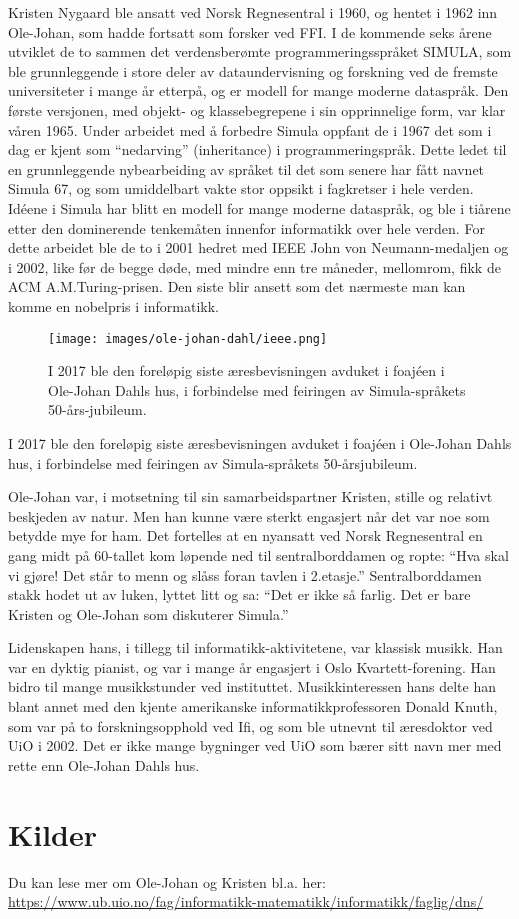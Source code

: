 Kristen Nygaard ble ansatt ved Norsk Regnesentral i 1960, og hentet i 1962 inn Ole-Johan, som hadde fortsatt som forsker ved FFI. I de kommende seks årene utviklet de to sammen det verdensberømte programmeringsspråket SIMULA, som ble grunnleggende i store deler av dataundervisning og forskning ved de fremste universiteter i mange år etterpå, og er modell for mange moderne dataspråk. Den første versjonen, med objekt- og klassebegrepene i sin opprinnelige form, var klar våren 1965. Under arbeidet med å forbedre Simula oppfant de i 1967 det som i dag er kjent som ``nedarving'' (inheritance) i programmeringspråk. Dette ledet til en grunnleggende nybearbeiding av språket til det som senere har fått navnet Simula 67, og som umiddelbart vakte stor oppsikt i fagkretser i hele verden. Idéene i Simula har blitt en modell for mange moderne dataspråk, og ble i tiårene etter den dominerende tenkemåten innenfor informatikk over hele verden. For dette arbeidet ble de to i 2001 hedret med IEEE John von Neumann-medaljen og i 2002, like før de begge døde, med mindre enn tre måneder, mellomrom, fikk de ACM A.M.Turing-prisen. Den siste blir ansett som det nærmeste man kan komme en nobelpris i informatikk.

\begin{figure}
	\texttt{[image: images/ole-johan-dahl/ieee.png]}
	\label{fig:ieee}
	\caption{I 2017 ble den foreløpig siste æresbevisningen avduket i foajéen i Ole-Johan Dahls hus, i forbindelse med feiringen av Simula-språkets 50-års-jubileum.}
\end{figure}

I 2017 ble den foreløpig siste æresbevisningen avduket i foajéen i Ole-Johan Dahls hus, i forbindelse med feiringen av Simula-språkets 50-årsjubileum.

Ole-Johan var, i motsetning til sin samarbeidspartner Kristen, stille og relativt beskjeden av natur. Men han kunne være sterkt engasjert når det var noe som betydde mye for ham. Det fortelles at en nyansatt ved Norsk Regnesentral en gang midt på 60-tallet kom løpende ned til sentralborddamen og ropte: ``Hva skal vi gjøre! Det står to menn og slåss foran tavlen i 2.etasje.'' Sentralborddamen stakk hodet ut av luken, lyttet litt og sa: ``Det er ikke så farlig. Det er bare Kristen og Ole-Johan som diskuterer Simula.''

Lidenskapen hans, i tillegg til informatikk-aktivitetene, var klassisk musikk. Han var en dyktig pianist, og var i mange år engasjert i Oslo Kvartett-forening. Han bidro til mange musikkstunder ved instituttet. Musikkinteressen hans delte han blant annet med den kjente amerikanske informatikkprofessoren Donald Knuth, som var på to forskningsopphold ved Ifi, og som ble utnevnt til æresdoktor ved UiO i 2002.
Det er ikke mange bygninger ved UiO som bærer sitt navn mer med rette enn Ole-Johan Dahls hus.

\section*{Kilder}

Du kan lese mer om Ole-Johan og Kristen bl.a. her: \url{https://www.ub.uio.no/fag/informatikk-matematikk/informatikk/faglig/dns/}
